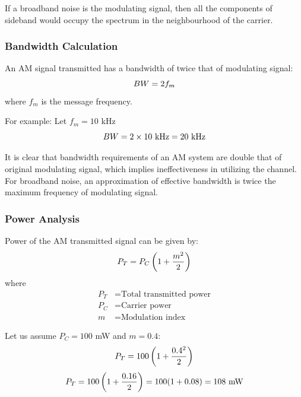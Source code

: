 \documentclass[12pt,a4paper]{report}
\begin{document}
	If a broadband noise is the modulating signal, then all the components of sideband would occupy the spectrum in the neighbourhood of the carrier.
	
	\subsubsection{Bandwidth Calculation}
	An AM signal transmitted has a bandwidth of twice that of modulating signal:
	\begingroup
	\setlength{\mathindent}{0pt}
	\begin{equation*}
		\hfill
		BW = 2f_m
		\hfill
	\end{equation*}
	\endgroup
	where $f_m$ is the message frequency.
	
	For example: Let $f_m = 10$ kHz
	\begingroup
	\setlength{\mathindent}{0pt}
	\begin{equation*}
		\hfill
		BW = 2 \times 10\ \text{kHz} = 20\ \text{kHz}
		\hfill
	\end{equation*}
	\endgroup
	
	It is clear that bandwidth requirements of an AM system are double that of original modulating signal, which implies ineffectiveness in utilizing the channel. For broadband noise, an approximation of effective bandwidth is twice the maximum frequency of modulating signal.
	
	\subsubsection{Power Analysis}
	Power of the AM transmitted signal can be given by:
	\begingroup
	\setlength{\mathindent}{0pt}
	\begin{equation*}
		\hfill
		P_T = P_C \left(1 + \frac{m^2}{2}\right)
		\hfill
	\end{equation*}
	\endgroup
	where
	\begin{align*}
		P_T &= \text{Total transmitted power} \\
		P_C &= \text{Carrier power} \\
		m &= \text{Modulation index}
	\end{align*}
	
	Let us assume $P_C = 100$ mW and $m = 0.4$:
	\begingroup
	\setlength{\mathindent}{0pt}
	\begin{equation*}
		\hfill
		P_T = 100 \left(1 + \frac{0.4^2}{2}\right)
		\hfill
	\end{equation*}
	\endgroup
	\begingroup
	\setlength{\mathindent}{0pt}
	\begin{equation*}
		\hfill
		P_T = 100 \left(1 + \frac{0.16}{2}\right) = 100(1 + 0.08) = 108\ \text{mW}
		\hfill
	\end{equation*}
	\endgroup
	
\end{document}
